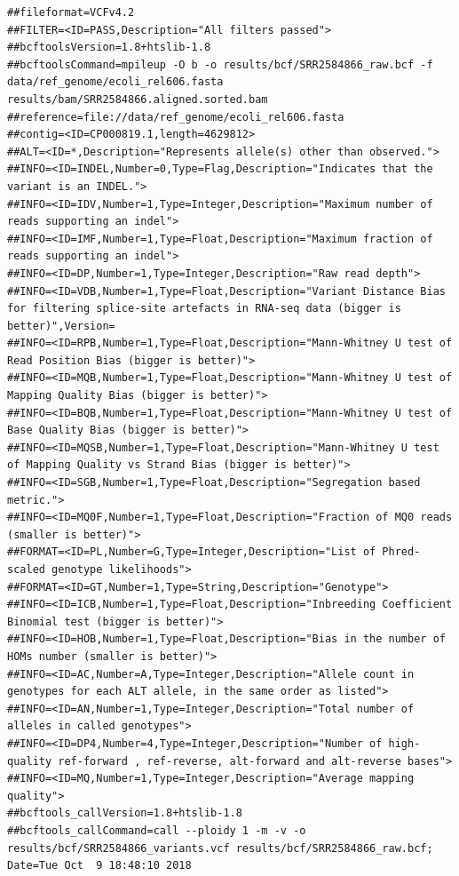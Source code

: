 \documentclass[
  letterpaper,
  DIV=11,
  numbers=noendperiod]{scrreprt}
\begin{document}
\begin{verbatim}
##fileformat=VCFv4.2
##FILTER=<ID=PASS,Description="All filters passed">
##bcftoolsVersion=1.8+htslib-1.8
##bcftoolsCommand=mpileup -O b -o results/bcf/SRR2584866_raw.bcf -f data/ref_genome/ecoli_rel606.fasta results/bam/SRR2584866.aligned.sorted.bam
##reference=file://data/ref_genome/ecoli_rel606.fasta
##contig=<ID=CP000819.1,length=4629812>
##ALT=<ID=*,Description="Represents allele(s) other than observed.">
##INFO=<ID=INDEL,Number=0,Type=Flag,Description="Indicates that the variant is an INDEL.">
##INFO=<ID=IDV,Number=1,Type=Integer,Description="Maximum number of reads supporting an indel">
##INFO=<ID=IMF,Number=1,Type=Float,Description="Maximum fraction of reads supporting an indel">
##INFO=<ID=DP,Number=1,Type=Integer,Description="Raw read depth">
##INFO=<ID=VDB,Number=1,Type=Float,Description="Variant Distance Bias for filtering splice-site artefacts in RNA-seq data (bigger is better)",Version=
##INFO=<ID=RPB,Number=1,Type=Float,Description="Mann-Whitney U test of Read Position Bias (bigger is better)">
##INFO=<ID=MQB,Number=1,Type=Float,Description="Mann-Whitney U test of Mapping Quality Bias (bigger is better)">
##INFO=<ID=BQB,Number=1,Type=Float,Description="Mann-Whitney U test of Base Quality Bias (bigger is better)">
##INFO=<ID=MQSB,Number=1,Type=Float,Description="Mann-Whitney U test of Mapping Quality vs Strand Bias (bigger is better)">
##INFO=<ID=SGB,Number=1,Type=Float,Description="Segregation based metric.">
##INFO=<ID=MQ0F,Number=1,Type=Float,Description="Fraction of MQ0 reads (smaller is better)">
##FORMAT=<ID=PL,Number=G,Type=Integer,Description="List of Phred-scaled genotype likelihoods">
##FORMAT=<ID=GT,Number=1,Type=String,Description="Genotype">
##INFO=<ID=ICB,Number=1,Type=Float,Description="Inbreeding Coefficient Binomial test (bigger is better)">
##INFO=<ID=HOB,Number=1,Type=Float,Description="Bias in the number of HOMs number (smaller is better)">
##INFO=<ID=AC,Number=A,Type=Integer,Description="Allele count in genotypes for each ALT allele, in the same order as listed">
##INFO=<ID=AN,Number=1,Type=Integer,Description="Total number of alleles in called genotypes">
##INFO=<ID=DP4,Number=4,Type=Integer,Description="Number of high-quality ref-forward , ref-reverse, alt-forward and alt-reverse bases">
##INFO=<ID=MQ,Number=1,Type=Integer,Description="Average mapping quality">
##bcftools_callVersion=1.8+htslib-1.8
##bcftools_callCommand=call --ploidy 1 -m -v -o results/bcf/SRR2584866_variants.vcf results/bcf/SRR2584866_raw.bcf; Date=Tue Oct  9 18:48:10 2018
\end{verbatim}
\end{document}
